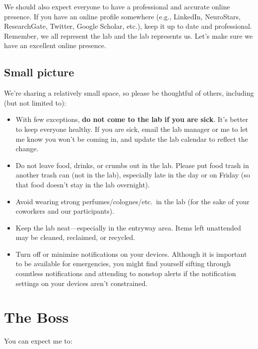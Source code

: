 \documentclass[letterpaper,12pt,oneside]{memoir}
\begin{document}
We should also expect everyone to have a professional and accurate online presence. If you have an online profile somewhere (e.g., LinkedIn, NeuroStars, ResearchGate, Twitter, Google Scholar, etc.), keep it up to date and professional. Remember, we all represent the lab and the lab represents us. Let's make sure we have an excellent online presence.


\subsection{Small picture}

We're sharing a relatively small space, so please be thoughtful of others, including (but not limited to):

\begin{itemize}
\item With few exceptions, \textbf{do not come to the lab if you are sick}. It's better to keep everyone healthy. If you are sick, email the lab manager or me to let me know you won't be coming in, and update the lab calendar to reflect the change.
\item Do not leave food, drinks, or crumbs out in the lab. Please put food trash in another trash can (not in the lab), especially late in the day or on Friday (so that food doesn't stay in the lab overnight).
\item Avoid wearing strong perfumes/colognes/etc.\ in the lab (for the sake of your coworkers and our participants).
\item Keep the lab neat---especially in the entryway area. Items left unattended may be cleaned, reclaimed, or recycled.
\item Turn off or minimize notifications on your devices. Although it is important to be available for emergencies, you might find yourself sifting through countless notifications and attending to nonstop alerts if the notification settings on your devices aren't constrained.
\end{itemize}


\section{The Boss}

You can expect me to:
\end{document}
